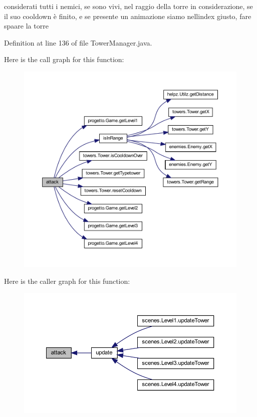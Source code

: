 considerati tutti i nemici, se sono vivi, nel raggio della torre in considerazione, se il suo cooldown è finito, e se presente un animazione siamo nell\textquotesingle{}index giusto, fare spaare la torre 



Definition at line 136 of file Tower\+Manager.\+java.

Here is the call graph for this function\+:\nopagebreak
\begin{figure}[H]
\begin{center}
\leavevmode
\includegraphics[width=350pt]{classmanagers_1_1_tower_manager_a337d987717311ab51a124a11a059f66c_cgraph}
\end{center}
\end{figure}
Here is the caller graph for this function\+:\nopagebreak
\begin{figure}[H]
\begin{center}
\leavevmode
\includegraphics[width=350pt]{classmanagers_1_1_tower_manager_a337d987717311ab51a124a11a059f66c_icgraph}
\end{center}
\end{figure}
\mbox{\label{classmanagers_1_1_tower_manager_a72fe1ffca978e99fd16994a10e7f8051}} 
